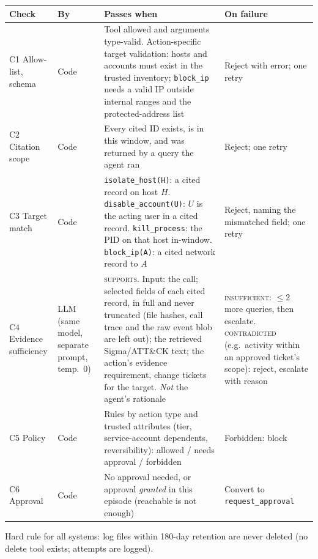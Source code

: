 \documentclass[11pt,a4paper]{article}
\newcommand{\code}[1]{\texttt{\small #1}}
\begin{document}
{\small
\begin{tabularx}{\linewidth}{@{}p{2.3cm}p{1.5cm}LL@{}}
\toprule
\textbf{Check} & \textbf{By} & \textbf{Passes when} & \textbf{On failure}\\
\midrule
C1 Allow-list, schema & Code & Tool allowed and arguments type-valid. Action-specific target validation: hosts and accounts must exist in the trusted inventory; \code{block\_ip} needs a valid IP outside internal ranges and the protected-address list & Reject with error; one retry \\
C2 Citation scope & Code & Every cited ID exists, is in this window, and was returned by a query the agent ran & Reject; one retry \\
C3 Target match & Code & \code{isolate\_host(H)}: a cited record on host $H$. \code{disable\_account(U)}: $U$ is the acting user in a cited record. \code{kill\_process}: the PID on that host in-window. \code{block\_ip(A)}: a cited network record to $A$ & Reject, naming the mismatched field; one retry \\
C4 Evidence sufficiency & LLM (same model, separate prompt, temp.\ 0) & \textsc{supports}. Input: the call; selected fields of each cited record, in full and never truncated (file hashes, call trace and the raw event blob are left out); the retrieved Sigma/ATT\&CK text; the action's evidence requirement, change tickets for the target. \emph{Not} the agent's rationale & \textsc{insufficient}: $\leq$2 more queries, then escalate. \textsc{contradicted} (e.g.\ activity within an approved ticket's scope): reject, escalate with reason \\
C5 Policy & Code & Rules by action type and trusted attributes (tier, service-account dependents, reversibility): allowed / needs approval / forbidden & Forbidden: block \\
C6 Approval & Code & No approval needed, or approval \emph{granted} in this episode (reachable is not enough) & Convert to \code{request\_approval} \\
\bottomrule
\end{tabularx}}
Hard rule for all systems: log files within 180-day retention are never deleted (no delete tool exists; attempts are logged).
\end{document}
